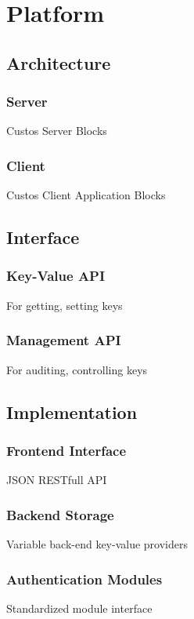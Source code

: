 \chapter{Platform}
\label{chap:platform}

\section{Architecture}

\subsection{Server}

Custos Server Blocks

\subsection{Client}

Custos Client Application Blocks

\section{Interface}

\subsection{Key-Value API}

For getting, setting keys

\subsection{Management API}

For auditing, controlling keys

\section{Implementation}

\subsection{Frontend Interface}

JSON RESTfull API

\subsection{Backend Storage}

Variable back-end key-value providers

\subsection{Authentication Modules}

Standardized module interface

